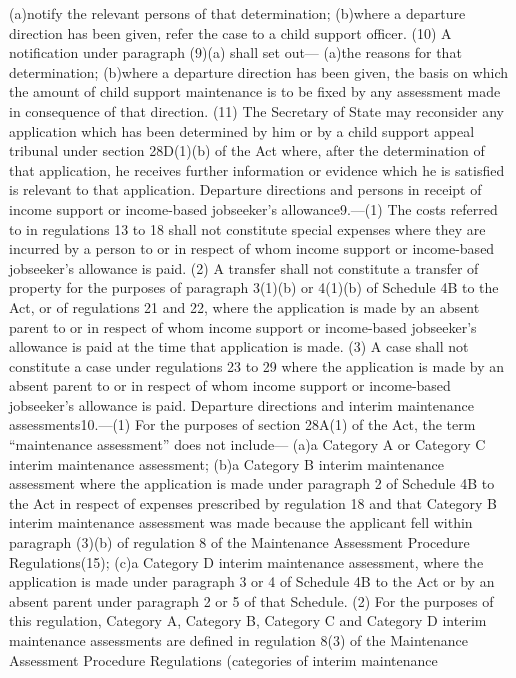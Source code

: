 \documentclass[a4paper]{article}
\begin{document}
(a)notify the relevant persons of that determination;
(b)where a departure direction has been given, refer the case to a child support
officer.
(10) A notification under paragraph (9)(a) shall set out—
(a)the reasons for that determination;
(b)where a departure direction has been given, the basis on which the amount of
child support maintenance is to be fixed by any assessment made in consequence
of that direction.
(11) The Secretary of State may reconsider any application which has been
determined by him or by a child support appeal tribunal under section 28D(1)(b)
of the Act where, after the determination of that application, he receives
further information or evidence which he is satisfied is relevant to that
application.
Departure directions and persons in receipt of income support or income-based
jobseeker’s allowance9.—(1) The costs referred to in regulations 13 to 18 shall
not constitute special expenses where they are incurred by a person to or in
respect of whom income support or income-based jobseeker’s allowance is paid.
(2) A transfer shall not constitute a transfer of property for the purposes of
paragraph 3(1)(b) or 4(1)(b) of Schedule 4B to the Act, or of regulations 21 and
22, where the application is made by an absent parent to or in respect of whom
income support or income-based jobseeker’s allowance is paid at the time that
application is made.
(3) A case shall not constitute a case under regulations 23 to 29 where the
application is made by an absent parent to or in respect of whom income support
or income-based jobseeker’s allowance is paid.
Departure directions and interim maintenance assessments10.—(1) For the purposes
of section 28A(1) of the Act, the term “maintenance assessment” does not
include—
(a)a Category A or Category C interim maintenance assessment;
(b)a Category B interim maintenance assessment where the application is made
under paragraph 2 of Schedule 4B to the Act in respect of expenses prescribed by
regulation 18 and that Category B interim maintenance assessment was made
because the applicant fell within paragraph (3)(b) of regulation 8 of the
Maintenance Assessment Procedure Regulations(15);
(c)a Category D interim maintenance assessment, where the application is made
under paragraph 3 or 4 of Schedule 4B to the Act or by an absent parent under
paragraph 2 or 5 of that Schedule.
(2) For the purposes of this regulation, Category A, Category B, Category C and
Category D interim maintenance assessments are defined in regulation 8(3) of the
Maintenance Assessment Procedure Regulations (categories of interim maintenance
\end{document}
